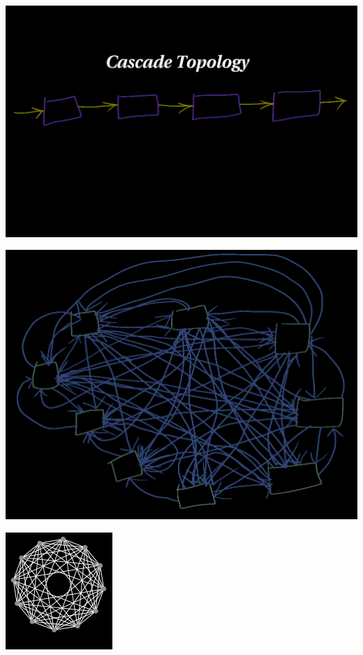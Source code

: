 \documentclass[fleqn,xcolor={usenames,dvipsnames}]{beamer} %
\begin{document}
\begin{frame}
\begin{center}
\includegraphics[scale=.30]{pics/cascade}
\end{center}
\end{frame}

\begin{frame}
\begin{center}
\includegraphics[scale=.30]{pics/free_route1}
\end{center}
\end{frame}

\begin{frame}
\begin{center}
\includegraphics[scale=1]{pics/free_route2}
\end{center}
\end{frame}
\end{document}
